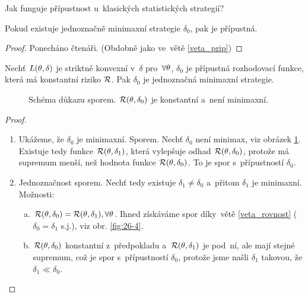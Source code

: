 Jak funguje přípustnost u~klasických statistických strategií?
\begin{theorem}\label{veta_mini}
	Pokud existuje jednoznačně minimaxní strategie $\delta_0$, pak je přípustná.\begin{proof}
		Ponecháno čtenáři. (Obdobně jako ve~větě \ref{veta_prip})
	\end{proof}
\end{theorem}
\begin{theorem}["Obrátka"]
	Nechť $L(\theta,\delta)$ je striktně konvexní v~$\delta$ pro~$\forall\theta$, $\delta_0$ je přípustná rozhodovací funkce, která má konstantní riziko $\mathcal{R}$. Pak $\delta_0$ je jednoznačná minimaxní strategie.
	\begin{figure}[h]
		\centering
		\caption{Schéma důkazu sporem. $ \mathcal{R}(\theta,\delta_0)$ je konstantní a~není minimaxní.}
		\label{fig:26-3}
	\end{figure}
	
	\begin{proof}
		\begin{enumerate}[1)]
			\item Ukážeme, že $\delta_0$ je minimaxní. Sporem. Nechť $\delta_0$ není minimax, viz obrázek \ref{fig:26-3}. Existuje tedy funkce $\mathcal{R}(\theta,\delta_1)$, která  vylepšuje odhad $\mathcal{R}(\theta,\delta_0)$, protože má supremum menší, než hodnota funkce $\mathcal{R}(\theta,\delta_0)$. To je spor s~přípustností $\delta_0$.
			\item Jednoznačnost sporem. Nechť tedy existuje $\delta_1\neq\delta_0$ a~přitom $\delta_1$ je minimaxní. Možnosti:
			\begin{enumerate}[a)]
				\item $\mathcal{R}(\theta,\delta_0)=\mathcal{R}(\theta,\delta_1),\forall\theta$. Ihned získáváme spor díky~větě \ref{veta_rovnost} ($\delta_0=\delta_1$ s.j.), viz obr. \ref{fig:26-4}.
				\item $\mathcal{R}(\theta,\delta_0)$ konstantní z~předpokladu a~$\mathcal{R}(\theta,\delta_1)$ je pod~ní, ale mají stejné supremum, což je spor s~přípustností $\delta_0$, protože jsme našli $\delta_1$ takovou, že $\delta_1\ll\delta_0$.
			\end{enumerate}
			

\end{enumerate}
\end{proof}
\end{theorem}
